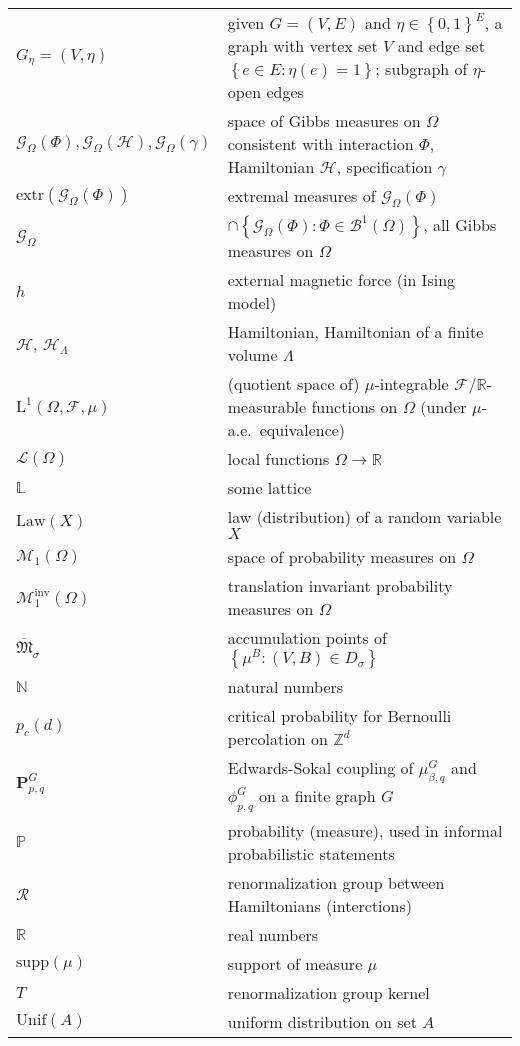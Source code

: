 \documentclass[12pt]{article}
\newcommand{\BB}{\mathscr{B}}
\newcommand{\F}{\mathcal{F}}
\newcommand{\G}{\mathcal{G}}
\renewcommand{\H}{\mathcal{H}}
\newcommand{\Loc}{\mathcal{L}}
\renewcommand{\L}{\mathbb{L}}
\newcommand{\M}{\mathcal{M}}
\newcommand{\N}{\mathbb{N}}
\renewcommand{\P}{\mathbb{P}}
\newcommand{\PP}{\mathbf{P}}
\newcommand{\R}{\mathbb{R}}
\newcommand{\RR}{\mathcal{R}}
\newcommand{\Z}{\mathbb{Z}}
\newcommand{\extr}{\mathrm{extr}}
\newcommand{\set}[1]{\left\{#1\right\}}
\newcommand{\ra}{\rightarrow}
\newcommand{\1}{\mathbbm{1}}
\newcommand{\supp}{\mathrm{supp}}
\newcommand{\5}{\vspace{0.5cm}}
\theoremstyle{definition}
\begin{document}
\begin{tabular}{p{4cm}p{10cm}}
$G_\eta=(V,\eta)$ & given $G=(V,E)$ and $\eta\in\set{0,1}^E$, a graph with vertex set $V$ and edge set $\set{e\in E:\eta(e)=1}$; subgraph of $\eta$-open edges \\
$\G_\Omega(\Phi),\G_\Omega(\H),\G_\Omega(\gamma)$ & space of Gibbs measures on $\Omega$ consistent with interaction $\Phi$, Hamiltonian $\H$, specification $\gamma$\\
$\extr(\G_\Omega(\Phi))$ & extremal measures of $\G_\Omega(\Phi)$ \\
$\G_\Omega$ & $\cap\set{\G_\Omega(\Phi):\Phi\in\BB^1(\Omega)}$, all Gibbs measures on $\Omega$ \\
$h$ & external magnetic force (in Ising model) \\
$\H$, $\H_\Lambda$ & Hamiltonian, Hamiltonian of a finite volume $\Lambda$ \\
$\mathrm{L}^1(\Omega,\F,\mu)$ & (quotient space of) $\mu$-integrable $\F/\R$-measurable functions on $\Omega$ (under $\mu$-a.e.~equivalence) \\
$\Loc(\Omega)$ & local functions $\Omega\ra\R$ \\
$\L$ & some lattice \\
$\mathrm{Law}(X)$ & law (distribution) of a random variable $X$ \\
$\M_1(\Omega)$ & space of probability measures on $\Omega$ \\
$\M_1^{\mathrm{inv}}(\Omega)$ & translation invariant probability measures on $\Omega$ \\
$\overline{\mathfrak{M}}_{\sigma}$ & accumulation points of $\set{\mu^B:(V,B)\in D_\sigma}$ \\
$\N$ & natural numbers \\
$p_c(d)$ & critical probability for Bernoulli percolation on $\Z^d$ \\
$\PP_{p,q}^G$ & Edwards-Sokal coupling of $\mu_{\beta,q}^G$ and $\phi_{p,q}^G$ on a finite graph $G$ \\
$\P$ & probability (measure), used in informal probabilistic statements \\
$\RR$ & renormalization group between Hamiltonians (interctions) \\
$\R$ & real numbers \\
$\supp(\mu)$ & support of measure $\mu$ \\
$T$ & renormalization group kernel \\
$\mathrm{Unif}(A)$ & uniform distribution on set $A$ \\

\end{tabular}
\end{document}
